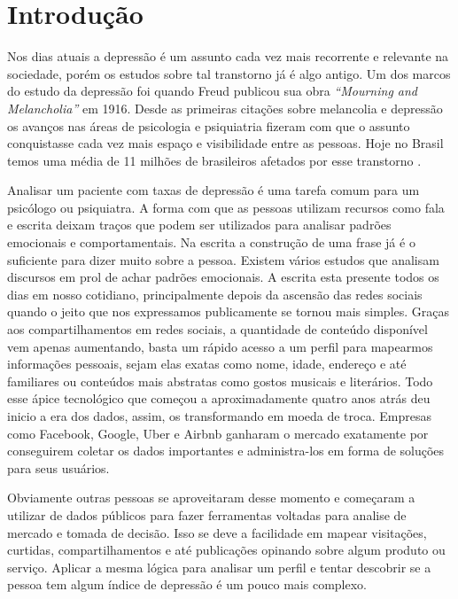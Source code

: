\chapter*[Introdução]{Introdução}

Nos dias atuais a depressão é um assunto cada vez mais recorrente e relevante na sociedade, porém os estudos sobre tal transtorno já é algo antigo. Um dos marcos do estudo da depressão foi quando Freud publicou sua obra \textit{“Mourning and Melancholia”} em 1916. Desde as primeiras citações sobre melancolia e depressão os avanços nas áreas de psicologia e psiquiatria fizeram com que o assunto conquistasse cada vez mais espaço e visibilidade entre as pessoas. Hoje no Brasil temos uma média de 11 milhões de brasileiros afetados por esse transtorno \cite{paho2017-letstalk}.

Analisar um paciente com taxas de depressão é uma tarefa comum para um psicólogo ou psiquiatra. A forma com que as pessoas utilizam recursos como fala e escrita deixam traços que podem ser utilizados para analisar padrões emocionais e comportamentais. Na escrita a construção de uma frase já é o suficiente para dizer muito sobre a pessoa. Existem vários estudos que analisam discursos em prol de achar padrões emocionais. A escrita esta presente todos os dias em nosso cotidiano, principalmente depois da ascensão das redes sociais quando o jeito que nos expressamos publicamente se tornou mais simples.
Graças aos compartilhamentos em redes sociais, a quantidade de conteúdo disponível vem apenas aumentando, basta um rápido acesso a um perfil para mapearmos informações pessoais, sejam elas exatas como nome, idade, endereço e até familiares ou conteúdos mais abstratas como gostos musicais e literários. Todo esse ápice tecnológico que começou a aproximadamente quatro anos atrás deu inicio a era dos dados, assim, os transformando em moeda de troca. Empresas como Facebook, Google, Uber e Airbnb ganharam o mercado exatamente por conseguirem coletar os dados importantes e administra-los em forma de soluções para seus usuários.

Obviamente outras pessoas se aproveitaram desse momento e começaram a utilizar de dados públicos para fazer ferramentas voltadas para analise de mercado e tomada de decisão. Isso se deve a facilidade em mapear visitações, curtidas, compartilhamentos e até publicações opinando sobre algum produto ou serviço. Aplicar a mesma lógica para analisar um perfil e tentar descobrir se a pessoa tem algum índice de depressão é um pouco mais complexo.


